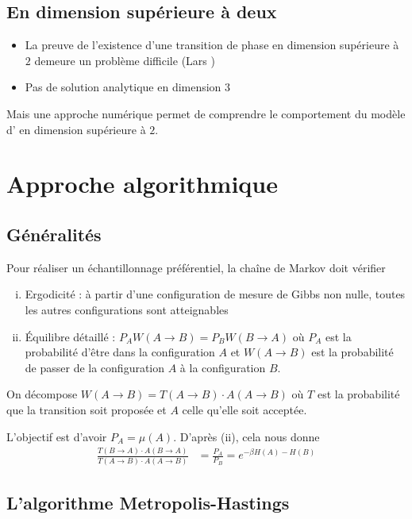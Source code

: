 \documentclass[french]{beamer}
\begin{document}
%
\subsection{En dimension supérieure à deux}
%

\begin{frame}
    \begin{itemize}
        \item La preuve de l'existence d'une transition de phase en dimension supérieure à $2$ demeure un problème difficile (Lars )
        \item Pas de solution analytique en dimension $3$
    \end{itemize}
    Mais une approche numérique permet de comprendre le comportement du modèle d' en dimension supérieure à $2$.
\end{frame}

\section{Approche algorithmique}
\subsection{Généralités}

\begin{frame}
Pour réaliser un échantillonnage préférentiel, la chaîne de Markov doit vérifier
\begin{enumerate}[(i)]
	\item Ergodicité : à partir d'une configuration de mesure de Gibbs non nulle, toutes les autres configurations sont atteignables
	\item \'Equilibre détaillé : $P_AW(A \to B) = P_BW(B \to A)$ où $P_A$ est la probabilité d'être dans la configuration $A$ et $W(A \to B)$ est la probabilité de passer de la configuration $A$ à la configuration $B$.
\end{enumerate}
On décompose $W(A \to B) = T(A \to B) \cdot A(A \to B)$ où $T$ est la probabilité que la transition soit proposée et $A$ celle qu'elle soit acceptée.

L'objectif est d'avoir $P_A = \mu(A)$. D'après (ii), cela nous donne 
\begin{align*}
\frac{T(B \to A)\cdot A(B \to A)}{T(A\to B)\cdot A(A \to B)} &= \frac{P_A}{P_B} = e^{-\beta{H(A) - H(B)}}
\end{align*}
\end{frame}

%
\subsection{L'algorithme Metropolis-Hastings}
%
\end{document}
